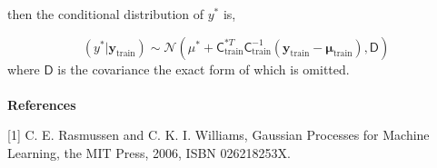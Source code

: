 \documentclass[a4paper,10.5pt]{article}
\begin{document}
then the conditional distribution of $y^*$ is,

\begin{equation}
	(y^* | \boldsymbol{y}_\text{train}) \sim \mathcal{N}(\mu^* +  \mathsf{C}^{* T}_\text{train}\mathsf{C}_\text{train}^{-1}(\boldsymbol{y}_\text{train} - \boldsymbol{\mu}_\text{train})
	, \mathsf{D})
\end{equation}
where $\mathsf{D}$ is the covariance the exact form of which is omitted. 
\\\\
{\large\bfseries{References}}

[1] C. E. Rasmussen and C. K. I. Williams, Gaussian Processes for Machine Learning, the MIT Press, 2006,
ISBN 026218253X.
\end{document}
